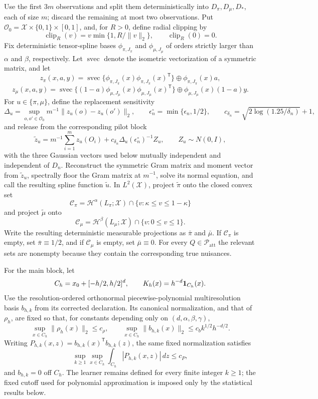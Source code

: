 Use the first \(3m\) observations and split them deterministically into \(D_\pi,D_\mu,D_*\), each of size \(m\); discard the remaining at most two observations.  Put \(\mathcal O_0=\mathcal X\times\{0,1\}\times[0,1]\), and, for \(R>0\), define radial clipping by
\[
 \operatorname{clip}_R(v)=v\min\{1,R/\lVert v\rVert_2\},
 \qquad \operatorname{clip}_R(0)=0.
\]
Fix deterministic tensor-spline bases \(\phi_{\pi,J_\pi}\) and \(\phi_{\mu,J_\mu}\) of orders strictly larger than \(\alpha\) and \(\beta\), respectively.  Let \(\operatorname{svec}\) denote the isometric vectorization of a symmetric matrix, and let
\[
 z_{\pi}(x,a,y)=\operatorname{svec}\{\phi_{\pi,J_\pi}(x)\phi_{\pi,J_\pi}(x)^{\mathsf T}\}
       \mathbin\oplus \phi_{\pi,J_\pi}(x)a,
\]
\[
 z_{\mu}(x,a,y)=\operatorname{svec}\{(1-a)\phi_{\mu,J_\mu}(x)\phi_{\mu,J_\mu}(x)^{\mathsf T}\}
       \mathbin\oplus \phi_{\mu,J_\mu}(x)(1-a)y.
\]
For \(u\in\{\pi,\mu\}\), define the replacement sensitivity
\[
 \Delta_u=\sup_{o,o'\in\mathcal O_0}m^{-1}\lVert z_u(o)-z_u(o')\rVert_2,
 \qquad
 \epsilon_n^\circ=\min\{\epsilon_n,1/2\},
 \qquad
 c_{\delta_n}=\sqrt{2\log(1.25/\delta_n)}+1,
\]
and release from the corresponding pilot block
\[
 \widetilde z_u=m^{-1}\sum_{i=1}^m z_u(O_i)
       +c_{\delta_n}\Delta_u(\epsilon_n^\circ)^{-1}Z_u,
 \qquad Z_u\sim N(0,I),
\]
with the three Gaussian vectors used below mutually independent and independent of \(D_n\).  Reconstruct the symmetric Gram matrix and moment vector from \(\widetilde z_u\), spectrally floor the Gram matrix at \(m^{-1}\), solve its normal equation, and call the resulting spline function \(\widetilde u\).  In \(L^2(\mathcal X)\), project \(\widetilde\pi\) onto the closed convex set
\[
 \mathcal C_\pi=\mathcal H^\alpha(L_\pi;\mathcal X)\cap\{v:\kappa\le v\le1-\kappa\}
\]
and project \(\widetilde\mu\) onto
\[
 \mathcal C_\mu=\mathcal H^\beta(L_\mu;\mathcal X)\cap\{v:0\le v\le1\}.
\]
Write the resulting deterministic measurable projections as \(\bar\pi\) and \(\bar\mu\).  If \(\mathcal C_\pi\) is empty, set \(\bar\pi\equiv1/2\), and if \(\mathcal C_\mu\) is empty, set \(\bar\mu\equiv0\).  For every \(Q\in\mathcal P_{\mathrm{att}}\) the relevant sets are nonempty because they contain the corresponding true nuisances.

For the main block, let
\[
 C_h=x_0+[-h/2,h/2]^d,
 \qquad K_h(x)=h^{-d}{\bf1}_{C_h}(x).
\]
Use the resolution-ordered orthonormal piecewise-polynomial multiresolution basis \(b_{h,k}\) from its corrected declaration.  Its canonical normalization, and that of \(\rho_h\), are fixed so that, for constants depending only on \((d,\alpha,\beta,\gamma)\),
\[
 \sup_{x\in C_h}\lVert\rho_h(x)\rVert_2\le c_\rho,
 \qquad
 \sup_{x\in C_h}\lVert b_{h,k}(x)\rVert_2\le c_b k^{1/2}h^{-d/2}.
\]
Writing \(P_{h,k}(x,z)=b_{h,k}(x)^{\mathsf T}b_{h,k}(z)\), the same fixed normalization satisfies
\[
 \sup_{k\ge1}\sup_{x\in C_h}\int_{C_h}|P_{h,k}(x,z)|\,dz\le c_P,
\]
and \(b_{h,k}=0\) off \(C_h\).  The learner remains defined for every finite integer \(k\ge1\); the fixed cutoff used for polynomial approximation is imposed only by the statistical results below.

